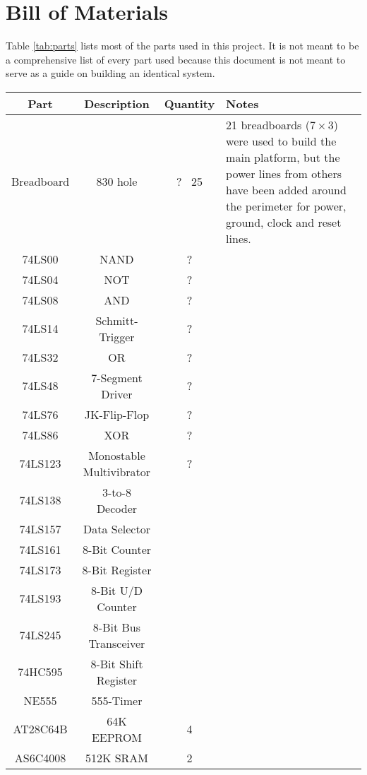 \section{Bill of Materials}
Table \ref{tab:parts} lists most of the parts used in this project. It is not meant to be a comprehensive list of every part used because this document is not meant to serve as a guide on building an identical system. 

\begin{table}[H]
  \centering
  \begin{tabular}{c|c|c|l}
    Part                   & Description & Quantity & Notes \\ \hline
    Breadboard             & 830 hole & ? ~25 & 21 breadboards ($7\times3$) were used to build the main platform, but the power lines from others have been added around the perimeter for power, ground, clock and reset lines. \\
    74LS00                 & NAND & ? &\\
    74LS04                 & NOT & ? &\\
    74LS08                 & AND & ? &\\
    74LS14                 & Schmitt-Trigger & ? &\\
    74LS32                 & OR & ? &\\
    74LS48                 & 7-Segment Driver & ? &\\
    74LS76                 & JK-Flip-Flop & ? &\\
    74LS86                 & XOR & ? &\\
    74LS123                & Monostable Multivibrator & ? &\\
    74LS138                & 3-to-8 Decoder & &\\
    74LS157                & Data Selector & &\\
    74LS161                & 8-Bit Counter & &\\
    74LS173                & 8-Bit Register & &\\
    74LS193                & 8-Bit U/D Counter & &\\
    74LS245                & 8-Bit Bus Transceiver & &\\
    74HC595                & 8-Bit Shift Register & &\\
    NE555                  & 555-Timer & &\\
    AT28C64B               & 64K EEPROM & 4 &\\
    AS6C4008               & 512K SRAM & 2 &\\

\end{tabular}
\end{table}
